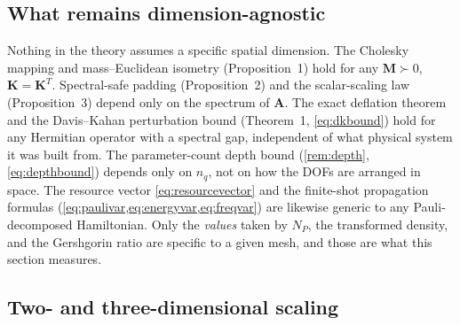 \documentclass{ieeeaccess}
\newcommand{\M}{\mathbf{M}}
\newcommand{\K}{\mathbf{K}}
\newcommand{\A}{\mathbf{A}}
\begin{document}
\subsection{What remains dimension-agnostic}

Nothing in the theory assumes a specific spatial dimension. The Cholesky mapping and mass--Euclidean isometry (Proposition~1) hold for any $\M\succ0$, $\K=\K^T$. Spectral-safe padding (Proposition~2) and the scalar-scaling law (Proposition~3) depend only on the spectrum of $\A$. The exact deflation theorem and the Davis--Kahan perturbation bound (Theorem~1, \cref{eq:dkbound}) hold for any Hermitian operator with a spectral gap, independent of what physical system it was built from. The parameter-count depth bound (\cref{rem:depth}, \cref{eq:depthbound}) depends only on $n_q$, not on how the DOFs are arranged in space. The resource vector \cref{eq:resourcevector} and the finite-shot propagation formulas (\cref{eq:paulivar,eq:energyvar,eq:freqvar}) are likewise generic to any Pauli-decomposed Hamiltonian. Only the \emph{values} taken by $N_P$, the transformed density, and the Gershgorin ratio are specific to a given mesh, and those are what this section measures.

\subsection{Two- and three-dimensional scaling}
\label{sec:dim-scaling}
\end{document}
